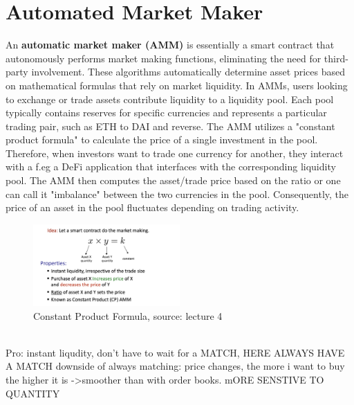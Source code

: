 \documentclass{article}
\begin{document}
\section{Automated Market Maker}
An \textbf{automatic market maker (AMM)} is essentially a smart contract that autonomously performs market making functions, eliminating the need for third-party involvement. These algorithms automatically determine asset prices based on mathematical formulas that rely on market liquidity. In AMMs, users looking to exchange or trade assets contribute liquidity to a liquidity pool. Each pool typically contains reserves for specific currencies and represents a particular trading pair, such as ETH to DAI and reverse. The AMM utilizes a "constant product formula" to calculate the price of a single investment in the pool. Therefore, when investors want to trade one currency for another, they interact with a f.eg a DeFi application that interfaces with the corresponding liquidity pool. The AMM then computes the asset/trade price based on the ratio or one can call it "imbalance" between the two currencies in the pool. Consequently, the price of an asset in the pool fluctuates depending on trading activity.
\\
\begin{figure}[h]
    \centering
    \includegraphics[width=0.5\textwidth]{Bildschirmfoto 2024-04-02 um 15.09.34.png} %
    \caption{Constant Product Formula, \scriptsize{source: lecture 4}}
    \label{fig:DoS-attack}
\end{figure}
\\
Pro: instant liqudity, don't have to wait for a MATCH, HERE ALWAYS HAVE A MATCH
downside of always matching: price changes, the more i want to buy the higher it is ->smoother than with order books. mORE SENSTIVE TO QUANTITY\\
\end{document}
